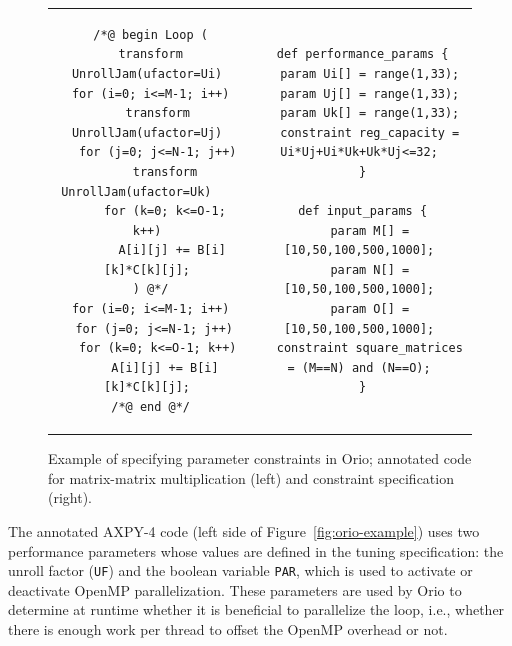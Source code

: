 \begin{figure}%
\centering 
\begin{tabular}{cc} 
\begin{minipage}{.5\textwidth}  
\scriptsize
\begin{verbatim}  
 /*@ begin Loop (
 transform UnrollJam(ufactor=Ui)
 for (i=0; i<=M-1; i++)
   transform UnrollJam(ufactor=Uj)
   for (j=0; j<=N-1; j++)
     transform UnrollJam(ufactor=Uk)   
     for (k=0; k<=O-1; k++)
       A[i][j] += B[i][k]*C[k][j];
 ) @*/
 for (i=0; i<=M-1; i++)
  for (j=0; j<=N-1; j++)
   for (k=0; k<=O-1; k++)
     A[i][j] += B[i][k]*C[k][j];
 /*@ end @*/
\end{verbatim}  
\end{minipage}
&
\begin{minipage}{.5\textwidth}  
\scriptsize
\begin{verbatim}  
 def performance_params {
   param Ui[] = range(1,33);
   param Uj[] = range(1,33);
   param Uk[] = range(1,33);
   constraint reg_capacity = Ui*Uj+Ui*Uk+Uk*Uj<=32;
 }

 def input_params {
   param M[] = [10,50,100,500,1000];
   param N[] = [10,50,100,500,1000];
   param O[] = [10,50,100,500,1000];
   constraint square_matrices = (M==N) and (N==O);
 }

\end{verbatim}  
\end{minipage}
\\
\end{tabular}
\caption{Example of specifying parameter constraints in Orio; annotated code for matrix-matrix multiplication (left) and constraint specification (right).}
\label{fig:par-constraint}  
\end{figure} 

The annotated AXPY-4 code (left side of Figure~\ref{fig:orio-example}) uses two
performance parameters whose values are defined in the tuning specification:
the unroll factor (\texttt{UF})
and the boolean variable \texttt{PAR}, which is used to activate or
deactivate OpenMP parallelization. 
These parameters are used by Orio to determine at runtime whether it is
beneficial to parallelize the loop, i.e., whether there is enough work per
thread to offset the OpenMP overhead or not.

